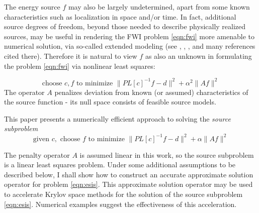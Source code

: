 The energy source $f$ may also be largely undetermined, apart from some known characteristics such as localization in space and/or time. In fact, additional source degrees of freedom, beyond those needed to describe physically realized sources, may be useful in rendering the FWI problem \ref{eqn:fwi} more amenable to numerical solution, via so-called extended modeling (see \cite{geoprosp:2008}, \cite{LeeuwenHerrmannWRI:13}, \cite{HuangNammourSymesDollizal:SEG19}, and many references cited there). Therefore it is natural to view $f$ as also an unknown in formulating the problem \ref{eqn:fwi} via nonlinear least squares:

\begin{equation}
\label{eqn:esi}
\mbox{choose } c, f \mbox{ to minimize } \|PL[c]^{-1}f -d \|^2 + \alpha^2 \|Af\|^2 
\end{equation}
The operator $A$ penalizes deviation from known (or assumed) characteristics of the source function - its null space consists of feasible source models. 

This paper presents a numerically efficient approach to solving the {\em source subproblem}
\begin{equation}
\label{eqn:esis}
\mbox{given } c, \mbox{ choose } f \mbox{ to minimize } \|PL[c]^{-1}f -d \|^2 + \alpha \|Af\|^2 
\end{equation}

The penalty operator $A$ is assumed linear in this work, so the source subproblem is a linear least squares problem. Under some additional assumptions to be described below, I shall show how to construct an accurate approximate solution operator for problem \ref{eqn:esis}. This approximate solution operator may be used to accelerate Krylov space methods for the solution of the source subproblem \ref{eqn:esis}. Numerical examples suggest the effectiveness of this acceleration.

